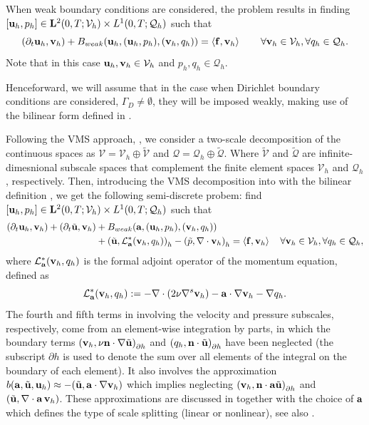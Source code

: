 When weak boundary conditions are considered, the problem results in finding $[{\bf u}_h,p_h]\in\mathbf{L}^2(0,T;\mathcal{V}_{h})\times L^1(0,T;\mathcal{Q}_{h})$ such that
\begin{equation}
\label{eq-C7_NS_galerkin_weak}
(\partial_t{\bf u}_h,{\bf v}_h)+B_{weak}({\bf u}_h,({\bf u}_h,p_h),({\bf v}_h,q_h)) =\left<{\bf f},{\bf v}_h\right>
\quad\quad\forall{\bf v}_h\in\mathcal{V}_{h},\forall q_h\in\mathcal{Q}_{h}.
\end{equation}
Note that in this case $ {\bf u}_h,{\bf v}_h\in\mathcal{V}_h $ and $ p_h,q_h\in\mathcal{Q}_h $.

Henceforward, we will assume that in the case when Dirichlet boundary conditions are considered, $ \Gamma_D\neq \emptyset $, they will be imposed weakly, making use of the bilinear form defined in .

Following the VMS approach, \cite{hughes_variational_1998}, we consider a two-scale decomposition of the continuous spaces as $ \mathcal{V}=\mathcal{V}_h\oplus\widetilde{\mathcal{V}} $ and $ \mathcal{Q}=\mathcal{Q}_h\oplus\widetilde{\mathcal{Q}} $. Where $ \widetilde{\mathcal{V}} $ and $\widetilde{\mathcal{Q}} $ are infinite-dimesnional subscale spaces that complement the finite element spaces $ \mathcal{V}_h $ and $ \mathcal{Q}_h $, respectively. Then, introducing the VMS decomposition into  with the bilinear definition , we get the following semi-discrete probem: find 
$[{\bf u}_h,p_h]\in\mathbf{L}^2(0,T;\mathcal{V}_{h})\times L^1(0,T;\mathcal{Q}_{h})$ such that
\begin{align}
\label{eq-C7_NS_vms_weak}
(\partial_t{\bf u}_h,{\bf v}_h)+(\partial_t\tilde{{\bf u}},{\bf v}_h)&+B_{weak}({\bf a},({\bf u}_h,p_h),({\bf v}_h,q_h))\\\nonumber
&+\left(\tilde{{\bf u}},\mathcal{L}^*_{\bf a}({\bf v}_h,q_h)\right)_h-\left(\tilde{p},\nabla\cdot{\bf v}_h\right)_h =\left<{\bf f},{\bf v}_h\right>
\quad\forall{\bf v}_h\in\mathcal{V}_{h},\forall q_h\in\mathcal{Q}_{h},
\end{align}
where $ \mathcal{L}^*_{\bf a}({\bf v}_h,q_h) $ is the formal adjoint operator of the momentum equation, defined as 
\begin{equation}
\label{eq-C7_NS_adjoint}
\mathcal{L}^*_{\bf a}({\bf v}_h,q_h):=-\nabla\cdot\left(2\nu\nabla^s{\bf v}_h\right)-{\bf a}\cdot\nabla{\bf v}_h-\nabla q_h.
\end{equation}
The fourth and fifth terms in  involving the velocity and pressure subscales, respectively, come from an element-wise integration by parts, in which the boundary terms 
$\left( {\bf v}_{h},\nu {\bf n}\cdot \nabla \tilde{{\bf u}}\right)_{\partial h}$ and
$\left( q_{h},{\bf n}\cdot \tilde{{\bf u}}\right)_{\partial h}$
have been neglected (the subscript ${\partial h}$ is used to denote the sum over all elements of the integral on the boundary of each element). It also involves the approximation 
$b({\bf a},\tilde{{\bf u}},{\bf u}_h) \approx -(\tilde{{\bf u}},{\bf a}\cdot\nabla{\bf v}_h)$
which implies neglecting 
$\left( {\bf v}_{h},{\bf n}\cdot {\bf a} \tilde{{\bf u}}\right)_{\partial h}$ and
$(\tilde{{\bf u}},\nabla\cdot{\bf a} \, {\bf v}_h)$. 
These approximations are discussed in  \cite{codina_time_2007} together with the choice of ${\bf a}$ which defines the type of scale splitting (linear or nonlinear), see also \cite{colomes_assessment_2015}.

